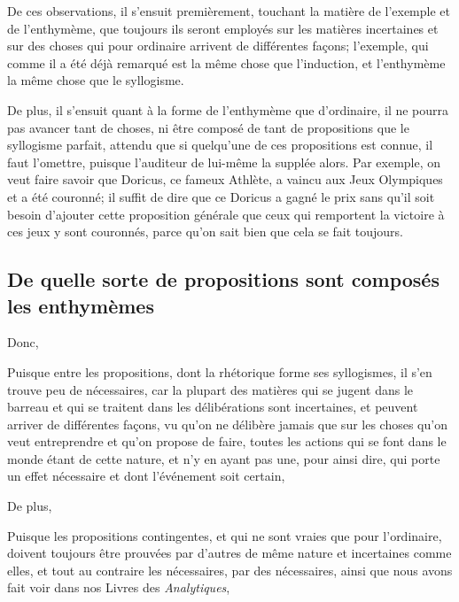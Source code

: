 \bigbreak

De ces observations, il s'ensuit premièrement, touchant la matière de l'exemple et de l'enthymème, que toujours ils seront employés sur les matières
incertaines et sur des choses qui pour ordinaire arrivent de différentes façons; l'exemple, qui comme il a été déjà remarqué est la même chose
que l'induction, et l'enthymème la même chose que le syllogisme.

De plus, il s'ensuit quant à la forme de l'enthymème que d'ordinaire, il ne pourra pas avancer tant de choses, ni être composé de tant de propositions
que le syllogisme parfait, attendu que si quelqu'une de ces propositions est connue, il faut l'omettre, puisque l'auditeur de lui-même la supplée alors.
Par exemple, on veut faire savoir que Doricus, ce fameux Athlète, a vaincu aux Jeux Olympiques et a été couronné; il suffit de dire que ce Doricus a
gagné le prix sans qu'il soit besoin d'ajouter cette proposition générale que ceux qui remportent la victoire à ces jeux y sont couronnés, parce qu'on
sait bien que cela se fait toujours. 

\subsection{De quelle sorte de propositions sont composés les enthymèmes}

Donc,

\begin{emphpar}
      Puisque entre les propositions, dont la rhétorique forme ses syllogismes, il s'en trouve peu de nécessaires, car la plupart des matières
      qui se jugent dans le barreau et qui se traitent dans les délibérations sont incertaines, et peuvent arriver de différentes façons, vu
       qu'on ne délibère jamais que sur les choses qu'on veut entreprendre et qu'on propose de faire, toutes les actions qui se font dans le
       monde étant de cette nature, et n'y en ayant pas une, pour ainsi dire, qui porte un effet nécessaire et dont l'événement soit certain,
\end{emphpar}

De plus,

\begin{emphpar}
      Puisque les propositions contingentes, et qui ne sont vraies que pour l'ordinaire, doivent toujours être prouvées par d'autres de même nature
      et incertaines comme elles, et tout au contraire les nécessaires, par des nécessaires, ainsi que nous avons fait voir dans nos Livres des
      \emph{Analytiques},
\end{emphpar}

